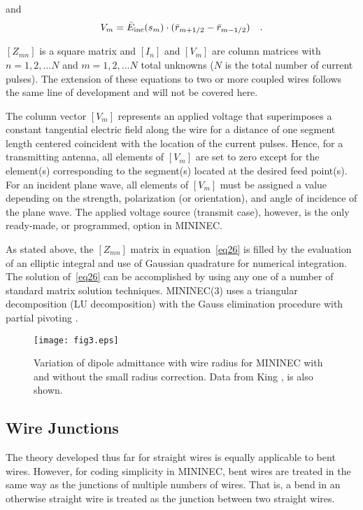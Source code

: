 \documentclass[12pt]{article}
\begin{document}
and
\begin{equation}
V_m = \bar{E}_{\mathrm{inc}}(s_m)\cdot(\bar{r}_{m+1/2}-\bar{r}_{m-1/2})
\quad.
\label{eq28}
\end{equation}

$[Z_{mn}]$ is a square matrix and $[I_n]$ and $[V_m]$ are column
matrices with $n=1,2,\ldots N$ and $m=1,2,\ldots N$ total unknowns ($N$ is
the total number of current pulses). The extension of these equations to
two or more coupled wires follows the same line of development and will
not be covered here.

The column vector $[V_m]$ represents an applied voltage that
superimposes a constant tangential electric field along the wire for a
distance of one segment length centered coincident with the location of
the current pulses. Hence, for a transmitting antenna, all elements of
$[V_m]$ are set to zero except for the element(s) corresponding to the
segment(s) located at the desired feed point(s). For an incident plane
wave, all elements of $[V_m]$ must be assigned a value depending on the
strength, polarization (or orientation), and angle of incidence of the
plane wave. The applied voltage source (transmit case), however, is the
only ready-made, or programmed, option in MININEC.

As stated above, the $[Z_{mn}]$ matrix in equation~\eqref{eq26} is
filled by the evaluation of an elliptic integral and use of Gaussian
quadrature for numerical integration. The solution of~\eqref{eq26} can
be accomplished by using any one of a number of standard matrix solution
techniques. MININEC(3) uses a triangular decomposition (LU
decomposition) with the Gauss elimination procedure with partial
pivoting \cite{r7}.

\begin{sidewaysfigure}[htb]
\centerline{\texttt{[image: fig3.eps]}}
\caption{Variation of dipole admittance with wire radius for MININEC
with and without the small radius correction. Data from King
\cite{r8}, \cite{r9} is also shown.}
\label{fig3}
\end{sidewaysfigure}
\afterpage\clearpage

\subsection{Wire Junctions}
The theory developed thus far for straight wires is equally applicable
to bent wires. However, for coding simplicity in MININEC, bent wires are
treated in the same way as the junctions of multiple numbers of wires.
That is, a bend in an otherwise straight wire is treated as the junction
between two straight wires.
\end{document}
